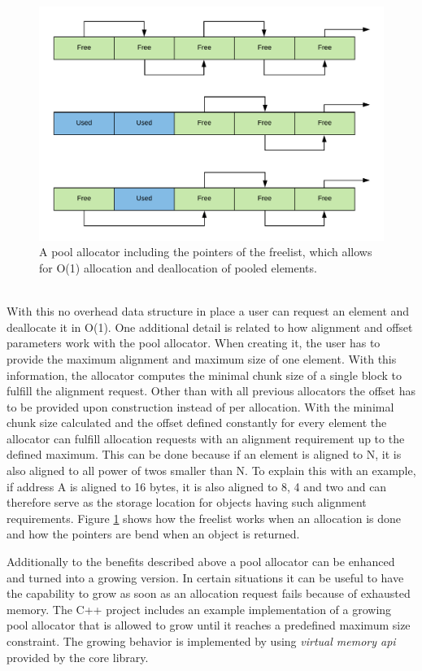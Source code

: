 \begin{figure}[h!]
	\centering \includegraphics[width=\linewidth]{PICs/pool_alloc.png}
	\caption{A pool allocator including the pointers of the freelist, which allows for O(1) allocation and deallocation of pooled elements.}
	\label{fig:pool_alloc}
\end{figure}

\noindent
\\
With this no overhead data structure in place a user can request an element and deallocate it in O(1). One additional detail is related to how alignment and offset parameters work with the pool allocator. When creating it, the user has to provide the maximum alignment and maximum size of one element. With this information, the allocator computes the minimal chunk size of a single block to fulfill the alignment request. Other than with all previous allocators the offset has to be provided upon construction instead of per allocation. With the minimal chunk size calculated and the offset defined constantly for every element the allocator can fulfill allocation requests with an alignment requirement up to the defined maximum. This can be done because if an element is aligned to N, it is also aligned to all power of twos smaller than N. To explain this with an example, if address A is aligned to 16 bytes, it is also aligned to 8, 4 and two and can therefore serve as the storage location for objects having such alignment requirements. Figure \ref{fig:pool_alloc} shows how the freelist works when an allocation is done and how the pointers are bend when an object is returned.

Additionally to the benefits described above a pool allocator can be enhanced and turned into a growing version. In certain situations it can be useful to have the capability to grow as soon as an allocation request fails because of exhausted memory. The C++ project includes an example implementation of a growing pool allocator that is allowed to grow until it reaches a predefined maximum size constraint. The growing behavior is implemented by using \textit{virtual memory api} provided by the core library.

